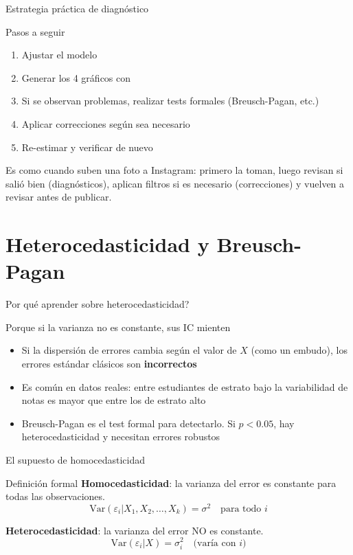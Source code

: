 \documentclass[aspectratio=169, 11pt]{beamer}
\begin{document}
\begin{frame}{Estrategia práctica de diagnóstico}
\begin{exampleblock}{Pasos a seguir}
\begin{enumerate}
\item Ajustar el modelo
\item Generar los 4 gr\'aficos con 
\item Si se observan problemas, realizar tests formales (Breusch-Pagan, etc.)
\item Aplicar correcciones seg\'un sea necesario
\item Re-estimar y verificar de nuevo
\end{enumerate}

\smallskip
\small Es como cuando suben una foto a Instagram: primero la toman, luego revisan si sali\'o bien (diagn\'osticos), aplican filtros si es necesario (correcciones) y vuelven a revisar antes de publicar.
\end{exampleblock}
\end{frame}

\section{Heterocedasticidad y Breusch-Pagan}

\begin{frame}{\textquestiondown{}Por qu\'e aprender sobre heterocedasticidad?}
\begin{exampleblock}{Porque si la varianza no es constante, sus IC mienten}
\small
\begin{itemize}\setlength{\itemsep}{2pt}
  \item Si la dispersi\'on de errores cambia seg\'un el valor de $X$ (como un embudo), los errores est\'andar cl\'asicos son \textbf{incorrectos}
  \item Es com\'un en datos reales: entre estudiantes de estrato bajo la variabilidad de notas es mayor que entre los de estrato alto
  \item Breusch-Pagan es el test formal para detectarlo. Si $p < 0.05$, hay heterocedasticidad y necesitan errores robustos
\end{itemize}
\end{exampleblock}
\end{frame}

\begin{frame}{El supuesto de homocedasticidad}
\begin{block}{Definici\'on formal}
\textbf{Homocedasticidad}: la varianza del error es constante para todas las observaciones.
$$\text{Var}(\varepsilon_i | X_1, X_2, \ldots, X_k) = \sigma^2 \quad \text{para todo } i$$
\end{block}

\textbf{Heterocedasticidad}: la varianza del error NO es constante.
$$\text{Var}(\varepsilon_i | X) = \sigma_i^2 \quad \text{(var\'ia con } i \text{)}$$
\end{frame}
\end{document}
